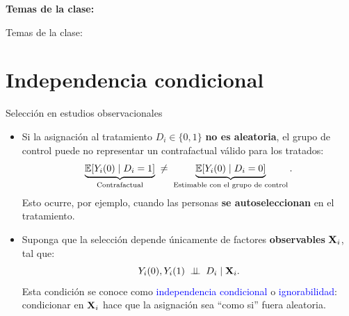 \documentclass[10pt, xcolor=dvipsnames]{beamer}
\subtitle{Estimadores de Matching y Reponderación}
\begin{document}
	\beamertemplatenavigationsymbolsempty	
\begin{frame}[plain]%
	\titlepage
	\vspace{-0.4cm}
\textbf{Temas de la clase:} \\ \vspace{0.3cm}
	\tableofcontents
\end{frame}

\begin{frame}{Temas de la clase:}
	\tableofcontents
\end{frame}

\section{Independencia condicional}

\begin{frame}{Selección en estudios observacionales}
\begin{itemize}
    \item Si la asignación al tratamiento \(D_i \in \{0,1\}\) \textbf{no es aleatoria}, el grupo de control puede no representar un contrafactual válido para los tratados:
    \vspace{-0.75em}
    \[
        \underbrace{\operatorname{\mathbb{E}}[Y_i(0) \mid D_i=1]}_{\text{Contrafactual}} \;\neq\; \underbrace{\operatorname{\mathbb{E}}[Y_i(0) \mid D_i=0]}_{\text{Estimable con el grupo de control}}.
    \]
    Esto ocurre, por ejemplo, cuando las personas \textbf{se autoseleccionan} en el tratamiento. %
    \vspace{0.5em}
    \item Suponga que la selección depende únicamente de factores \textbf{observables} \(\textbf{X}_i\), tal que:   
    \vspace{-0.5em}
    \[
        Y_i(0),Y_i(1) \;\perp \!\!\! \perp\; D_i \mid \textbf{X}_i.
    \]
     Esta condición se conoce como \textcolor{blue}{independencia condicional} o \textcolor{blue}{ignorabilidad}: condicionar en \(\textbf{X}_i\) hace que la asignación sea ``como si'' fuera aleatoria. 
\end{itemize}
\end{frame}
\end{document}
